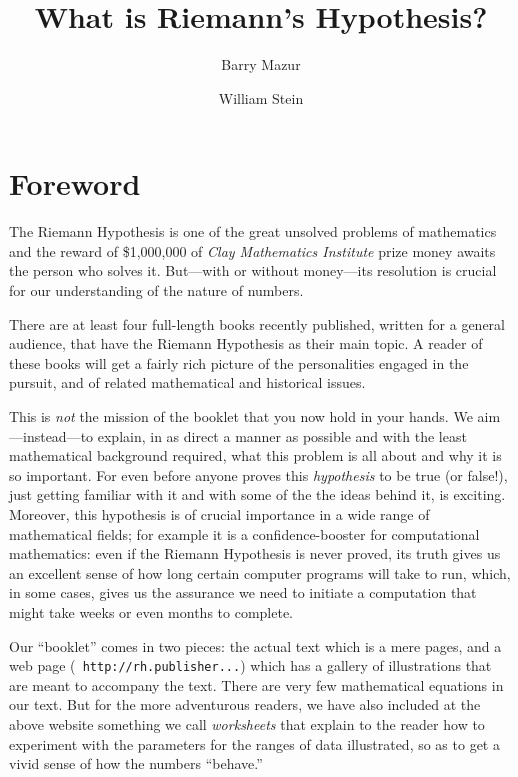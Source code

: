 \documentclass[11pt]{article}
\title{What is Riemann's Hypothesis?}
\author{Barry Mazur \and William Stein}
\theoremstyle{plain}
\theoremstyle{definition}
\numberwithin{equation}{section}
\numberwithin{figure}{section}
\numberwithin{table}{section}
\begin{document}
\maketitle
\tableofcontents

\section{\label{foreword}Foreword}

\bigskip

The Riemann Hypothesis is one of the great unsolved problems of
mathematics and the reward of \$1,000,000 of {\em Clay Mathematics
  Institute} prize money awaits the person who solves it. But---with
or without money---its resolution is crucial for our understanding of
the nature of numbers.

There are at least four full-length books recently published, written
for a general audience, that have the Riemann Hypothesis as their main
topic.  A reader of these books will get a fairly rich picture of the
personalities engaged in the pursuit, and of related mathematical and
historical issues.
     
This is {\em not} the mission of the booklet that you now hold in your
hands. We aim---instead---to explain, in as direct a manner as
possible and with the least mathematical background required, what
this problem is all about and why it is so important. For even before
anyone proves this {\em hypothesis} to be true (or false!), just
getting familiar with it and with some of the the ideas behind it, is
exciting.  Moreover, this hypothesis is of crucial importance in a
wide range of mathematical fields; for example it is a
confidence-booster for computational mathematics: even if the Riemann
Hypothesis is never proved, its truth gives us an excellent sense of
how long certain computer programs will take to run, which, in some
cases, gives us the assurance we need to initiate a computation that
might take weeks or even months to complete.

      
Our ``booklet'' comes in two pieces: the actual text which is a mere
\pageref{lastpage} pages, and a web page ({\tt
  http://rh.publisher...}) which has a gallery of illustrations that
are meant to accompany the text.  There are very few mathematical
equations in our text.  But for the more adventurous readers, we have
also included at the above website something we call {\em worksheets}
that explain to the reader how to experiment with the parameters for
the ranges of data illustrated, so as to get a vivid sense of how the
numbers ``behave.''
 
\end{document}
